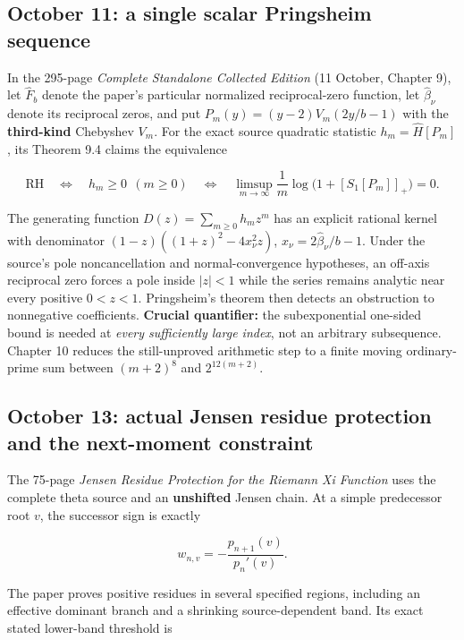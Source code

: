 \documentclass[
  10pt,
  a4paper,
  10pt,
  oneside,
  openany]{book}
\begin{document}
\subsection{October 11: a single scalar Pringsheim
sequence}\label{october-11-a-single-scalar-pringsheim-sequence}

In the 295-page \emph{Complete Standalone Collected Edition} (11
October, Chapter 9), let \(\widehat F_b\) denote the paper's particular
normalized reciprocal-zero function, let \(\widehat\beta_\nu\) denote
its reciprocal zeros, and put \(P_m(y)=(y-2)V_m(2y/b-1)\) with the
\textbf{third-kind} Chebyshev \(V_m\). For the exact source quadratic
statistic \(h_m=\widehat H[P_m]\), its Theorem 9.4 claims the
equivalence

\[
 \mathrm{RH}\quad\Longleftrightarrow\quad h_m\ge0\ \ (m\ge0)
 \quad\Longleftrightarrow\quad
 \limsup_{m\to\infty}\frac1m\log\bigl(1+[S_1[P_m]]_+\bigr)=0.
 \tag{A32}\label{eq:A32}
\]

The generating function \(D(z)=\sum_{m\ge0}h_mz^m\) has an explicit
rational kernel with denominator \((1-z)((1+z)^2-4x_\nu^2z)\),
\(x_\nu=2\widehat\beta_\nu/b-1\). Under the source's pole
noncancellation and normal-convergence hypotheses, an off-axis
reciprocal zero forces a pole inside \(|z|<1\) while the series remains
analytic near every positive \(0<z<1\). Pringsheim's theorem then
detects an obstruction to nonnegative coefficients. \textbf{Crucial
quantifier:} the subexponential one-sided bound is needed at \emph{every
sufficiently large index}, not an arbitrary subsequence. Chapter 10
reduces the still-unproved arithmetic step to a finite moving
ordinary-prime sum between \((m+2)^8\) and \(2^{12(m+2)}\).

\subsection{October 13: actual Jensen residue protection and the
next-moment
constraint}\label{october-13-actual-jensen-residue-protection-and-the-next-moment-constraint}

The 75-page \emph{Jensen Residue Protection for the Riemann Xi Function}
uses the complete theta source and an \textbf{unshifted} Jensen chain.
At a simple predecessor root \(v\), the successor sign is exactly

\[
 w_{n,v}=-\frac{p_{n+1}(v)}{p_n'(v)}.
 \tag{A33}\label{eq:A33}
\]

The paper proves positive residues in several specified regions,
including an effective dominant branch and a shrinking source-dependent
band. Its exact stated lower-band threshold is
\end{document}
